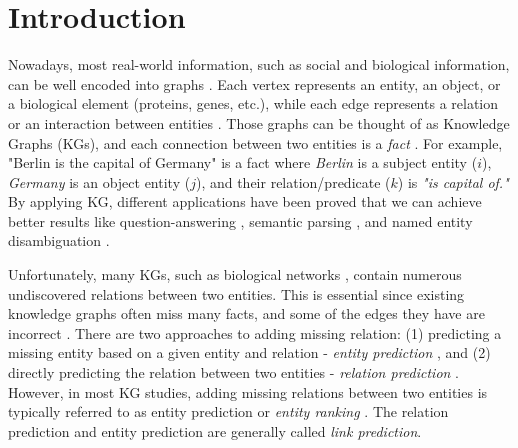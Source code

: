 \chapter{Introduction}
\label{cha:intro}
Nowadays, most real-world information, such as social and biological information, can be well encoded into graphs \citep{lu2011link}. Each vertex represents an entity, an object, or a biological element (proteins, genes, etc.), while each edge represents a relation or an interaction between entities \citep{chang2020benchmark}. Those graphs can be thought of as Knowledge Graphs (KGs), and each connection between two entities is a \textit{fact} \citep{2016}. For example, "Berlin is the capital of Germany" is a fact where \textit{Berlin} is a subject entity ($i$), \textit{Germany} is an object entity ($j$), and their relation/predicate ($k$) is \textit{"is capital of."} By applying KG, different applications have been proved that we can achieve better results like question-answering \citep{bordes2014question, bordes2014open}, semantic parsing \citep{berant2013semantic, heck2013leveraging}, and named entity disambiguation \citep{Damljanovic2012NamedED, 38389}.

Unfortunately, many KGs, such as biological networks \citep{amaral2008truer, stumpf2008estimating, yu2008high}, contain numerous undiscovered relations between two entities. This is essential since existing knowledge graphs often miss many facts, and some of the edges they have are incorrect \citep{angeli2013philosophers}. There are two approaches to adding missing relation: (1) predicting a missing entity based on a given entity and relation - \textit{entity prediction} \citep{wang2017knowledge}, and (2) directly predicting the relation between two entities - \textit{relation prediction} \citep{lin2015modeling, xie2016representation}. However, in most KG studies, adding missing relations between two entities is typically referred to as entity prediction or \textit{entity ranking} \citep{lin2015modeling}. The relation prediction and entity prediction are generally called \textit{link prediction}.

